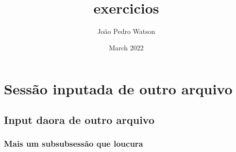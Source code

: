 \documentclass{article}[12pt, A4]
\title{exercicios}
\author{João Pedro Watson}
\date{March 2022}
\begin{document}
\maketitle

\section{Sessão inputada de outro arquivo}
\subsection{Input daora de outro arquivo}
\subsubsection{Mais um subsubsessão que loucura}
\end{document}
